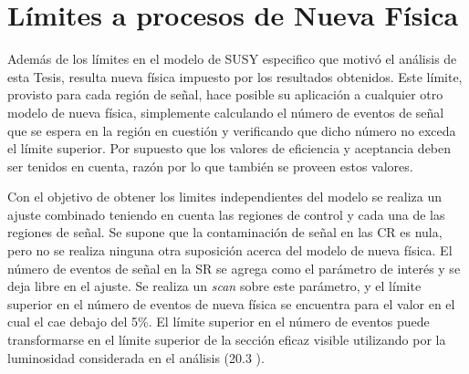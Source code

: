 

\section{Límites a procesos de Nueva Física} \label{sec:model_independent}



Además de los límites en el modelo de SUSY especifico que motivó el análisis de
esta Tesis, resulta %
nueva física impuesto por los resultados obtenidos. Este límite, provisto para
cada región de señal, hace posible su aplicación a cualquier otro modelo de
nueva física, simplemente calculando el número de eventos de señal que se espera
en la región en cuestión y verificando que dicho número no exceda el límite
superior. Por supuesto que los valores de eficiencia y aceptancia deben ser
tenidos en cuenta, razón por lo que también se proveen estos valores.

Con el objetivo de obtener los limites independientes del modelo se realiza un
ajuste combinado teniendo en cuenta las regiones de control y cada una de las
regiones de señal. Se supone que la contaminación de señal en las CR es nula,
pero no se realiza ninguna otra suposición acerca del modelo de nueva física. El
número de eventos de señal en la SR se agrega como el parámetro de interés y se
deja libre en el ajuste. Se realiza un \emph{scan} sobre este parámetro, y el
límite superior en el número de eventos de nueva física se encuentra para el
valor en el cual el {\cls} cae debajo del 5\%. El límite superior en el número
de eventos puede transformarse en el límite superior de la sección eficaz
visible utilizando por la luminosidad considerada en el análisis
(20.3 \ifb).


